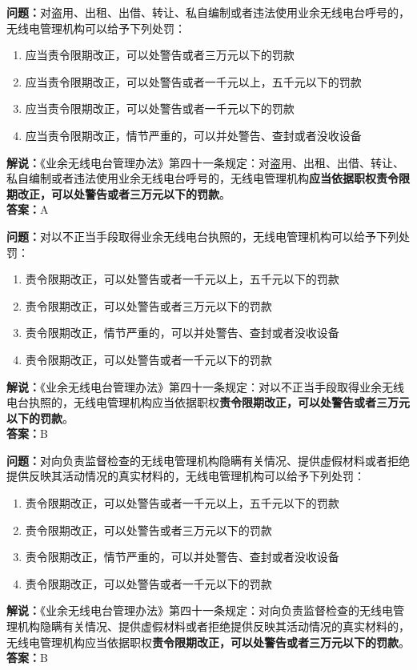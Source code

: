 \documentclass{ctexbook}
\begin{document}
\bigskip


\noindent\textbf{问题：}对盗用、出租、出借、转让、私自编制或者违法使用业余无线电台呼号的，无线电管理机构可以给予下列处罚：
\begin{enumerate}[label=\Alph*), leftmargin=3em]
	\item 应当责令限期改正，可以处警告或者三万元以下的罚款
	\item 应当责令限期改正，可以处警告或者一千元以上，五千元以下的罚款
	\item 应当责令限期改正，可以处警告或者一千元以下的罚款
	\item 应当责令限期改正，情节严重的，可以并处警告、查封或者没收设备
\end{enumerate}
\noindent\textbf{解说：}《业余无线电台管理办法》第四十一条规定：对盗用、出租、出借、转让、私自编制或者违法使用业余无线电台呼号的，无线电管理机构\textbf{应当依据职权责令限期改正，可以处警告或者三万元以下的罚款}。\\\textbf{答案：}A

\bigskip


\noindent\textbf{问题：}对以不正当手段取得业余无线电台执照的，无线电管理机构可以给予下列处罚：
\begin{enumerate}[label=\Alph*), leftmargin=3em]
	\item 责令限期改正，可以处警告或者一千元以上，五千元以下的罚款
	\item 责令限期改正，可以处警告或者三万元以下的罚款
	\item 责令限期改正，情节严重的，可以并处警告、查封或者没收设备
	\item 责令限期改正，可以处警告或者一千元以下的罚款
\end{enumerate}
\noindent\textbf{解说：}《业余无线电台管理办法》第四十一条规定：对以不正当手段取得业余无线电台执照的，无线电管理机构应当依据职权\textbf{责令限期改正，可以处警告或者三万元以下的罚款}。\\\textbf{答案：}B

\bigskip


\noindent\textbf{问题：}对向负责监督检查的无线电管理机构隐瞒有关情况、提供虚假材料或者拒绝提供反映其活动情况的真实材料的，无线电管理机构可以给予下列处罚：
\begin{enumerate}[label=\Alph*), leftmargin=3em]
	\item 责令限期改正，可以处警告或者一千元以上，五千元以下的罚款
	\item 责令限期改正，可以处警告或者三万元以下的罚款
	\item 责令限期改正，情节严重的，可以并处警告、查封或者没收设备
	\item 责令限期改正，可以处警告或者一千元以下的罚款
\end{enumerate}
\noindent\textbf{解说：}《业余无线电台管理办法》第四十一条规定：对向负责监督检查的无线电管理机构隐瞒有关情况、提供虚假材料或者拒绝提供反映其活动情况的真实材料的，无线电管理机构应当依据职权\textbf{责令限期改正，可以处警告或者三万元以下的罚款}。\\\textbf{答案：}B
\end{document}
